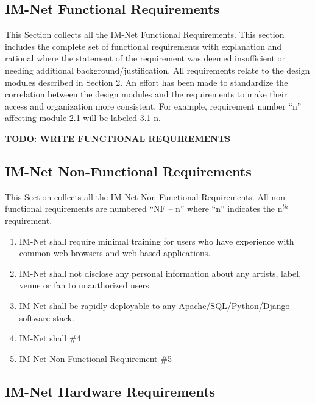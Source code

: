 \documentclass[letterpaper]{article}
\begin{document}
{\textcolor{subsection}{\subsection{IM-Net Functional Requirements}}

This Section collects all the IM-Net Functional Requirements. This section includes the complete set of functional requirements with explanation and rational where the statement of the requirement was deemed insufficient or needing additional background/justification. All requirements relate to the design modules described in Section 2. An effort has been made to standardize the correlation between the design modules and the requirements to make their access and organization more consistent. For example, requirement number ``n'' affecting module 2.1 will be labeled 3.1-n.

\textbf{TODO: WRITE FUNCTIONAL REQUIREMENTS}\\

\textcolor{subsection}{\subsection{IM-Net Non-Functional Requirements}}

This Section collects all the IM-Net Non-Functional Requirements. All non-functional requirements are numbered ``NF -- n'' where ``n'' indicates the n${}^{th}$ requirement.

\begin{enumerate}
\item  IM-Net shall require minimal training for users who have experience with common web browsers and web-based applications.

\item  IM-Net shall not disclose any personal information about any artists, label, venue or fan to unauthorized users.

\item  IM-Net shall be rapidly deployable to any Apache/SQL/Python/Django software stack.

\item  IM-Net shall  \#4

\item  IM-Net Non Functional Requirement \#5
\end{enumerate}

\textcolor{subsection}{\subsection{IM-Net Hardware Requirements}}

}
\end{document}
